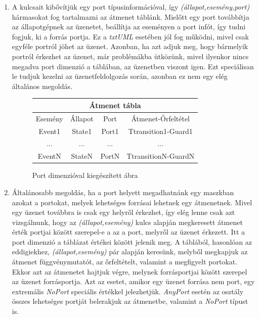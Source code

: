\documentclass[a4paper,12pt]{report}
\begin{document}
\begin{enumerate}
\item A kulcsait kibővítjük egy port típusinformációval, így \textit{(állapot,esemény,port)} hármasokat fog tartalmazni az átmenet táblánk. Mielőtt egy port továbbítja az állapotgépnek az üzenetet, beállítja az eseményen a port infót, így tudni fogjuk, ki a forrás portja. Ez a \textit{txtUML} esetében jól fog működni, mivel csak egyféle portról jöhet az üzenet. Azonban, ha azt adjuk meg, hogy bármelyik portról érkezhet az üzenet, már problémákba ütközünk, mivel ilyenkor nincs megadva port dimenzió a táblában, az üzenetben viszont igen. Ezt speciálisan le tudjuk kezelni az üzenetfeldolgozás során, azonban ez nem egy elég általános megoldás. \\

\begin{figure}[H]
\begin{center}
\begin{tabular}{@{}ccc|c@{}} \toprule
\multicolumn{4}{c}{Átmenet tábla} \\\midrule
Esemény & Állapot 	& Port 	& Átmenet-Őrfeltétel\\\midrule
Event1 	& State1 	& Port1 & Ttransition1-Guard1 \\
... 	& ... 		& ... 	& ... \\
EventN 	& StateN 	& PortN & TtransitionN-GuardN
\end{tabular}
\small
\caption{Port dimenzióval kiegészített ábra}
\end{center}
\end{figure}

\item Általánosabb megoldás, ha a port helyett megadhatnánk egy maszkban azokat a portokat, melyek lehetséges forrásai lehetnek egy átmenetnek. Mivel egy üzenet továbbra is csak egy helyről érkezhet, így elég lenne csak azt vizsgálnunk, hogy az \textit{(állapot,esemény)} kulcs alapján megkeresett átmenet érték portjai között szerepel-e a az a port, melyről az üzenet érkezett. Itt a port dimenzió a táblázat értékei között jelenik meg. A táblából, hasonlóan az eddigiekhez, \textit{(állapot,esemény)} pár alapján keresünk, melyből megkapjuk az átmenet függvénymutatót, az őrfeltételt, valamint a megfigyelt portokat. Ekkor azt az átmenetet hajtjuk végre, melynek forrásportjai között szerepel az üzenet forrásportja. Azt az esetet, amikor egy üzenet forrása nem port, egy extremális \textit{NoPort} speciális értékkel jelezhetjük. \textit{AnyPort} esetén az osztály összes lehetséges portját belerakjuk az átmenetbe, valamint a \textit{NoPort} típust is. \\


\end{enumerate}
\end{document}
